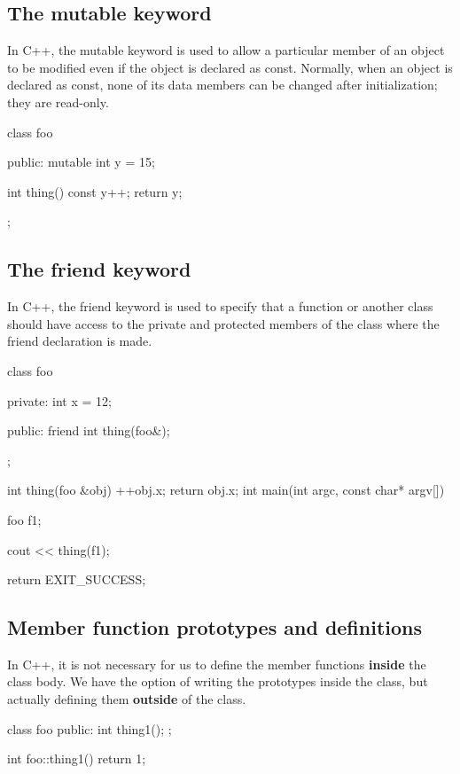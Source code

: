 \documentclass{report}
\begin{document}
    \bigbreak \noindent 
    \subsection{The mutable keyword}
    \bigbreak \noindent 
    In C++, the mutable keyword is used to allow a particular member of an object to be modified even if the object is declared as const. Normally, when an object is declared as const, none of its data members can be changed after initialization; they are read-only.
    \bigbreak \noindent 
    
    \begin{cppcode}
class foo {
public: 
    mutable int y = 15;
    
    int thing() const {
        y++;
        return y;
    }
};
    \end{cppcode}
    

    \pagebreak
    \subsection{The friend keyword}
    \bigbreak \noindent 
    In C++, the friend keyword is used to specify that a function or another class should have access to the private and protected members of the class where the friend declaration is made.
    \bigbreak \noindent 
    
    \begin{cppcode}
class foo {
private: 
    int x = 12;

public:
    friend int thing(foo&);
};

int thing(foo &obj) {
    ++obj.x;
    return obj.x;
}
int main(int argc, const char* argv[]) {

    foo f1;

    cout << thing(f1);
    
    return EXIT_SUCCESS;
}
    \end{cppcode}
    

    \bigbreak \noindent 
    \subsection{Member function prototypes and definitions}
    \bigbreak \noindent 
    In C++, it is not necessary for us to define the member functions \textbf{inside} the class body. We have the option of writing the prototypes inside the class, but actually defining them \textbf{outside} of the class.
    \bigbreak \noindent 
    
    \begin{cppcode}
class foo {
public:
    int thing1();
};

int foo::thing1() {
    return 1;
}
    \end{cppcode}
    
\end{document}
